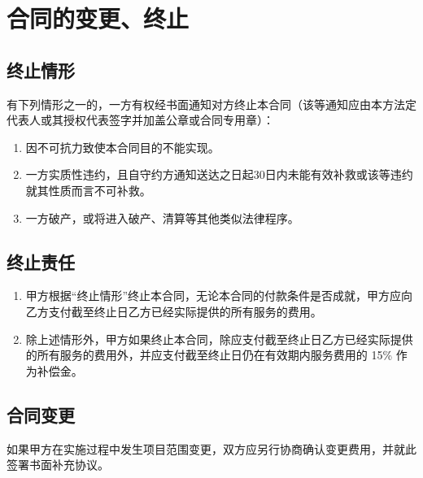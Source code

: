 \section{合同的变更、终止}

\subsection{终止情形}
有下列情形之一的，一方有权经书面通知对方终止本合同（该等通知应由本方法定代表人或其授权代表签字并加盖公章或合同专用章）： 
\begin{enumerate}
  \item 因不可抗力致使本合同目的不能实现。
  \item 一方实质性违约，且自守约方通知送达之日起30日内未能有效补救或该等违约就其性质而言不可补救。
  \item 一方破产，或将进入破产、清算等其他类似法律程序。
\end{enumerate}

\subsection{终止责任}
\begin{enumerate}
  \item 甲方根据“终止情形”终止本合同，无论本合同的付款条件是否成就，甲方应向乙方支付截至终止日乙方已经实际提供的所有服务的费用。
  \item 除上述情形外，甲方如果终止本合同，除应支付截至终止日乙方已经实际提供的所有服务的费用外，并应支付截至终止日仍在有效期内服务费用的 15\% 作为补偿金。
\end{enumerate}

\subsection{合同变更}
如果甲方在实施过程中发生项目范围变更，双方应另行协商确认变更费用，并就此签署书面补充协议。
